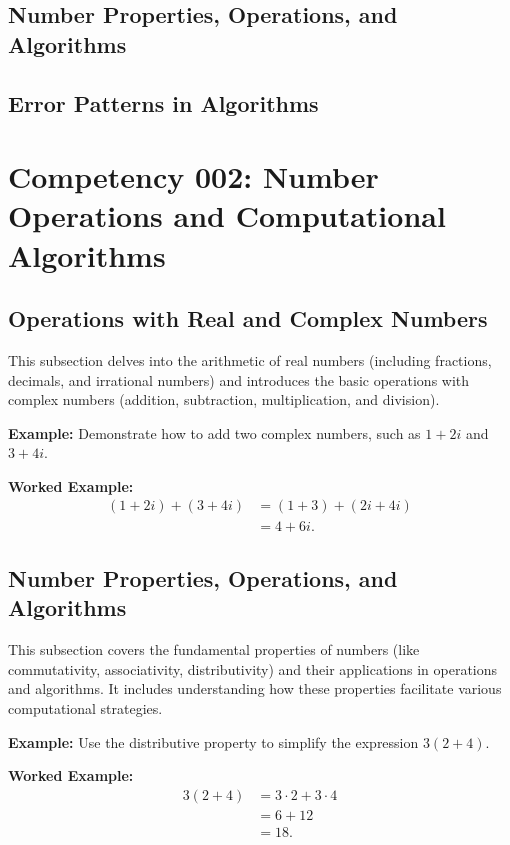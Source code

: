 \documentclass{book}
\begin{document}
\subsection{Number Properties, Operations, and Algorithms}
\subsection{Error Patterns in Algorithms}


\section{Competency 002: Number Operations and Computational Algorithms}
\subsection{Operations with Real and Complex Numbers}
This subsection delves into the arithmetic of real numbers (including fractions, decimals, and irrational numbers) and introduces the basic operations with complex numbers (addition, subtraction, multiplication, and division).


\textbf{Example:} Demonstrate how to add two complex numbers, such as \(1 + 2i\) and \(3 + 4i\).


\textbf{Worked Example:}
\begin{align*}
        (1 + 2i) + (3 + 4i) &= (1 + 3) + (2i + 4i) \\
                             &= 4 + 6i.
\end{align*}


\subsection{Number Properties, Operations, and Algorithms}
This subsection covers the fundamental properties of numbers (like commutativity, associativity, distributivity) and their applications in operations and algorithms. It includes understanding how these properties facilitate various computational strategies.


\textbf{Example:} Use the distributive property to simplify the expression \(3(2 + 4)\).


\textbf{Worked Example:}
\begin{align*}
        3(2 + 4) &= 3 \cdot 2 + 3 \cdot 4 \\
                  &= 6 + 12 \\
                  &= 18.
\end{align*}
\end{document}
